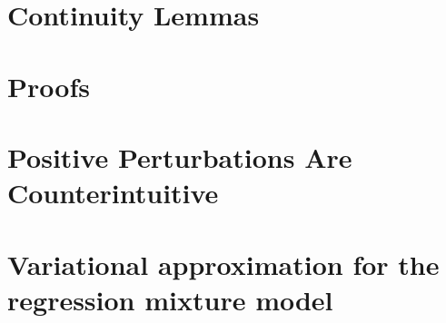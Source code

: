 \documentclass[11pt]{article}
\begin{document}





\clearpage
\newpage

\appendix
\section*{Continuity Lemmas}


\section*{Proofs}


\section*{Positive Perturbations Are Counterintuitive}



\section*{Variational approximation for the regression mixture model}

\end{document}
